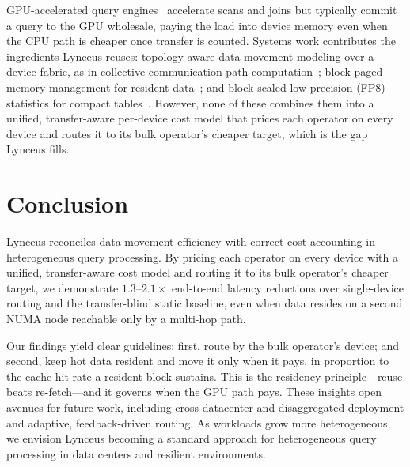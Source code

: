 \documentclass{article}
\begin{document}
GPU-accelerated query engines~\citep{breitbart2016gpu} accelerate scans and joins
but typically commit a query to the GPU wholesale, paying the load into device
memory even when the CPU path is cheaper once transfer is counted. Systems work
contributes the ingredients Lynceus reuses: topology-aware data-movement modeling
over a device fabric, as in collective-communication path
computation~\citep{nccl2020}; block-paged memory management for resident
data~\citep{kwon2023efficient}; and block-scaled low-precision (FP8) statistics
for compact tables~\citep{deepseekv3}. However, none of these combines them into a
unified, transfer-aware per-device cost model that prices each operator on every
device and routes it to its bulk operator's cheaper target, which is the gap
Lynceus fills.

\section{Conclusion}
\label{sec:conclusion}

Lynceus reconciles data-movement efficiency with correct cost accounting in
heterogeneous query processing. By pricing each operator on every device with a
unified, transfer-aware cost model and routing it to its bulk operator's cheaper
target, we demonstrate $1.3$--$2.1\times$ end-to-end latency reductions over
single-device routing and the transfer-blind static baseline, even when data
resides on a second NUMA node reachable only by a multi-hop path.

Our findings yield clear guidelines: first, route by the bulk operator's device;
and second, keep hot data resident and move it only when it pays, in proportion
to the cache hit rate a resident block sustains. This is the residency
principle---reuse beats re-fetch---and it governs when the GPU path pays. These
insights open avenues for future work, including cross-datacenter and
disaggregated deployment and adaptive, feedback-driven routing. As workloads grow
more heterogeneous, we envision Lynceus becoming a standard approach for
heterogeneous query processing in data centers and resilient environments.
\end{document}
